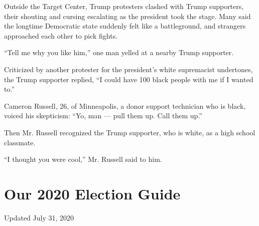 Outside the Target Center, Trump protesters clashed with Trump
supporters, their shouting and cursing escalating as the president took
the stage. Many said the longtime Democratic state suddenly felt like a
battleground, and strangers approached each other to pick fights.

``Tell me why you like him,'' one man yelled at a nearby Trump
supporter.

Criticized by another protester for the president's white supremacist
undertones, the Trump supporter replied, ``I could have 100 black people
with me if I wanted to.''

Cameron Russell, 26, of Minneapolis, a donor support technician who is
black, voiced his skepticism: ``Yo, man --- pull them up. Call them
up.''

Then Mr. Russell recognized the Trump supporter, who is white, as a high
school classmate.

``I thought you were cool,'' Mr. Russell said to him.

\hypertarget{our-2020-election-guide}{%
\section{Our 2020 Election Guide}\label{our-2020-election-guide}}

Updated July 31, 2020


